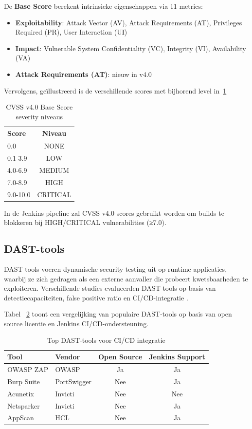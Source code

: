 De \textbf{Base Score} berekent intrinsieke eigenschappen via 11 metrics:
\begin{itemize}
    \item \textbf{Exploitability}: Attack Vector (AV), Attack Requirements (AT), Privileges Required (PR), User Interaction (UI)
    \item \textbf{Impact}: Vulnerable System Confidentiality (VC), Integrity (VI), Availability (VA)
    \item \textbf{Attack Requirements (AT)}: nieuw in v4.0
\end{itemize}

Vervolgens, geïllustreerd is de verschillende scores met bijhorend level in~\ref{tab:cvss-v4-scores}
\begin{table}[H]
  \centering
  \caption{CVSS v4.0 Base Score severity niveaus}
  \begin{tabular}{|l|c|}
  \hline
  \textbf{Score} & \textbf{Niveau} \\
  \hline
  0.0 & NONE \\
  0.1-3.9 & LOW \\
  4.0-6.9 & MEDIUM \\
  7.0-8.9 & HIGH \\
  9.0-10.0 & CRITICAL \\
  \hline
  \end{tabular}
  \label{tab:cvss-v4-scores}
\end{table}
  
In de Jenkins pipeline zal CVSS v4.0-scores gebruikt worden om builds te blokkeren bij HIGH/CRITICAL vulnerabilities (≥7.0).
\subsection{DAST-tools}

DAST-tools voeren dynamische security testing uit op runtime-applicaties, waarbij ze zich gedragen als een externe aanvaller die probeert kwetsbaarheden te exploiteren. Verschillende studies evalueerden DAST-tools op basis van detectiecapaciteiten, false positive ratio en CI/CD-integratie \autocite{AIMultipleDAST2025,AppSecSanta2025}.

Tabel ~\ref{tab:dast-tools} toont een vergelijking van populaire DAST-tools op basis van open source licentie en Jenkins CI/CD-ondersteuning.

\begin{table}[H]
  \centering
  \caption{Top DAST-tools voor CI/CD integratie \autocite{AIMultipleDAST2025}}
  \begin{tabular}{|l|l|c|c|}
  \hline
  \textbf{Tool} & \textbf{Vendor} & \textbf{Open Source} & \textbf{Jenkins Support} \\
  \hline
  OWASP ZAP & OWASP & Ja & Ja \\
  Burp Suite & PortSwigger & Nee & Ja \\
  Acunetix & Invicti & Nee & Nee \\
  Netsparker & Invicti & Nee & Ja \\
  AppScan & HCL & Nee & Ja \\
  \hline
  \end{tabular}
  \label{tab:dast-tools}
\end{table}


